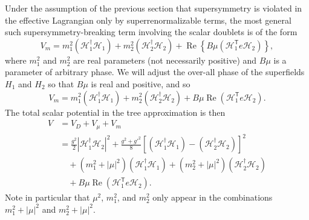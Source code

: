 Under the assumption of the previous section that supersymmetry is violated
in the effective Lagrangian only by superrenormalizable terms, the most
general such supersymmetry-breaking term involving the scalar doublets is
of the form
\[
  V_m
  =m_1^2\left(\mathcal{H}_1^\dagger\mathcal{H}_1\right)
  +m_2^2\left(\mathcal{H}_2^\dagger\mathcal{H}_2\right)
  +\operatorname{Re}\left\{
    B\mu\left(\mathcal{H}_1^{\mathsf T}e\mathcal{H}_2\right)
  \right\},
\]
where \(m_1^2\) and \(m_2^2\) are real parameters (not necessarily
positive) and \(B\mu\) is a parameter of arbitrary phase. We will adjust
the over-all phase of the superfields \(H_1\) and \(H_2\) so that \(B\mu\)
is real and positive, and so
\begin{equation}
  V_m
  =m_1^2\left(\mathcal{H}_1^\dagger\mathcal{H}_1\right)
  +m_2^2\left(\mathcal{H}_2^\dagger\mathcal{H}_2\right)
  +B\mu\operatorname{Re}
    \left(\mathcal{H}_1^{\mathsf T}e\mathcal{H}_2\right).
  \tag{28.5.9}\label{eq:28.5.9}
\end{equation}
The total scalar potential in the tree approximation is then
\begin{equation}
  \begin{aligned}
  V
  &=V_D+V_\mu+V_m\\
  &=\frac{g^2}{2}
    \left|\mathcal{H}_1^\dagger\mathcal{H}_2\right|^2
    +\frac{g^2+g'^2}{8}
    \left[
      \left(\mathcal{H}_1^\dagger\mathcal{H}_1\right)
      -\left(\mathcal{H}_2^\dagger\mathcal{H}_2\right)
    \right]^2\\
  &\quad
    +(m_1^2+|\mu|^2)
      \left(\mathcal{H}_1^\dagger\mathcal{H}_1\right)
    +(m_2^2+|\mu|^2)
      \left(\mathcal{H}_2^\dagger\mathcal{H}_2\right)\\
  &\quad
    +B\mu\operatorname{Re}
      \left(\mathcal{H}_1^{\mathsf T}e\mathcal{H}_2\right).
  \end{aligned}
  \tag{28.5.10}\label{eq:28.5.10}
\end{equation}
Note in particular that \(\mu^2\), \(m_1^2\), and \(m_2^2\) only appear
in the combinations \(m_1^2+|\mu|^2\) and \(m_2^2+|\mu|^2\).

